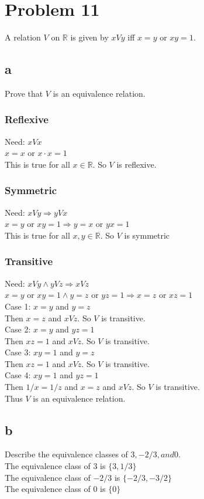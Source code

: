 \documentclass{article}
\begin{document}
\section*{Problem 11}
A relation $V$ on $\mathbb{R}$ is given by $xVy$ iff $x=y$ or $xy = 1$. 
\subsection*{a}
Prove that $V$ is an equivalence relation.\\
\subsubsection*{Reflexive}
Need: $xVx$ \\
$x = x$ or $x \cdot x = 1$ \\
This is true for all $x \in \mathbb{R}$. So $V$ is reflexive.
\subsubsection*{Symmetric}
Need: $xVy \Rightarrow yVx$ \\
$x = y$ or $xy = 1 \Rightarrow y = x$ or $yx = 1$ \\
This is true for all $x, y \in \mathbb{R}$. So $V$ is symmetric
\subsubsection*{Transitive}
Need: $xVy \land yVz \Rightarrow xVz$ \\
$x = y$ or $xy = 1 \land y = z$ or $yz = 1 \Rightarrow x = z$ or $xz = 1$ \\
{Case 1: $x = y$ and $y = z$}\\
Then $x = z$ and $xVz$. So $V$ is transitive.\\
{Case 2: $x = y$ and $yz = 1$}\\
Then $xz = 1$ and $xVz$. So $V$ is transitive.\\
{Case 3: $xy = 1$ and $y = z$}\\
Then $xz = 1$ and $xVz$. So $V$ is transitive.\\
{Case 4: $xy = 1$ and $yz = 1$}\\
Then $1/x = 1/z$ and $x=z$ and $xVz$. So $V$ is transitive.\\
Thus $V$ is an equivalence relation.
\subsection*{b}
Describe the equivalence classes of $3, -2/3, and 0$.\\
The equivalence class of $3$ is $\{3, 1/3\}$\\
The equivalence class of $-2/3$ is $\{-2/3, -3/2\}$\\
The equivalence class of $0$ is $\{0\}$\\ 
\end{document}
